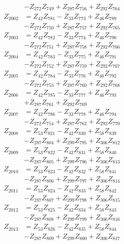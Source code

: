 \begin{multicols}{2}
\begin{align}
&- Z_{272}Z_{749} + Z_{287}Z_{756} + Z_{292}Z_{764} \nonumber \\
Z_{2002} &= Z_{42}Z_{781} - Z_{33}Z_{773} + Z_{46}Z_{789}  \nonumber \\
&- Z_{272}Z_{750} + Z_{287}Z_{757} + Z_{292}Z_{765} \nonumber \\
Z_{2003} &= Z_{42}Z_{782} - Z_{33}Z_{774} + Z_{46}Z_{790}  \nonumber \\
&- Z_{272}Z_{751} + Z_{287}Z_{758} + Z_{292}Z_{766} \nonumber \\
Z_{2004} &= Z_{42}Z_{783} - Z_{33}Z_{775} + Z_{46}Z_{791}  \nonumber \\
&- Z_{272}Z_{752} + Z_{287}Z_{759} + Z_{292}Z_{767} \nonumber \\
Z_{2005} &= Z_{42}Z_{784} - Z_{33}Z_{776} + Z_{46}Z_{792}  \nonumber \\
&- Z_{272}Z_{753} + Z_{287}Z_{760} + Z_{292}Z_{768} \nonumber \\
Z_{2006} &= Z_{42}Z_{785} - Z_{33}Z_{777} + Z_{46}Z_{793}  \nonumber \\
&+ Z_{287}Z_{761} + Z_{292}Z_{769} \nonumber \\
Z_{2007} &= Z_{42}Z_{786} - Z_{33}Z_{778} + Z_{46}Z_{794}  \nonumber \\
&- Z_{272}Z_{754} + Z_{287}Z_{762} + Z_{292}Z_{770} \nonumber \\
Z_{2008} &= Z_{53}Z_{821} - Z_{42}Z_{830} + Z_{58}Z_{839}  \nonumber \\
&- Z_{287}Z_{804} + Z_{299}Z_{795} + Z_{306}Z_{812} \nonumber \\
Z_{2009} &= Z_{53}Z_{822} - Z_{42}Z_{831} + Z_{58}Z_{840}  \nonumber \\
&- Z_{287}Z_{805} + Z_{299}Z_{796} + Z_{306}Z_{813} \nonumber \\
Z_{2010} &= Z_{53}Z_{823} - Z_{42}Z_{832} + Z_{58}Z_{841}  \nonumber \\
&- Z_{287}Z_{806} + Z_{299}Z_{797} + Z_{306}Z_{814} \nonumber \\
Z_{2011} &= Z_{53}Z_{824} - Z_{42}Z_{833} + Z_{58}Z_{842}  \nonumber \\
&- Z_{287}Z_{807} + Z_{299}Z_{798} + Z_{306}Z_{815} \nonumber \\
Z_{2012} &= Z_{53}Z_{825} - Z_{42}Z_{834} + Z_{58}Z_{843}  \nonumber \\
&- Z_{287}Z_{808} + Z_{299}Z_{799} + Z_{306}Z_{816} \nonumber \\
Z_{2013} &= Z_{53}Z_{826} - Z_{42}Z_{835} + Z_{58}Z_{844}  \nonumber \\
&- Z_{287}Z_{809} + Z_{299}Z_{800} + Z_{306}Z_{817} \nonumber \\

\end{align}
\end{multicols}
